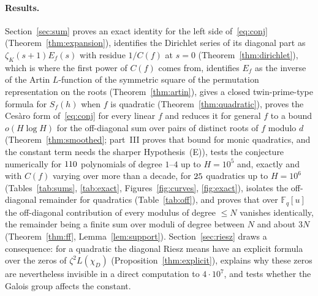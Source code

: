 \documentclass[11pt,a4paper]{article}
\theoremstyle{remark}\newtheorem{remark}[theorem]{Remark}
\newcommand{\F}{\mathbb{F}}
\begin{document}
\paragraph{Results.} Section~\ref{sec:sum} proves an exact identity for the left side
of~\eqref{eq:conj} (Theorem~\ref{thm:expansion}), identifies the Dirichlet series of its diagonal part
as $\zeta_K(s+1)E_f(s)$ with residue $1/C(f)$ at $s=0$ (Theorem~\ref{thm:dirichlet}), which is where
the first power of $C(f)$ comes from, identifies $E_f$ as the inverse of the Artin $L$-function of the
symmetric square of the permutation representation on the roots (Theorem~\ref{thm:artin}), gives a
closed twin-prime-type formula for $S_f(h)$ when $f$ is quadratic (Theorem~\ref{thm:quadratic}), proves
the Ces\`aro form of~\eqref{eq:conj} for every linear $f$ and reduces it for general $f$ to a bound
$o(H\log H)$ for the off-diagonal sum over pairs of distinct roots of $f$ modulo $d$
(Theorem~\ref{thm:smoothed}; part~III proves that bound for monic quadratics, and the constant term needs the sharper Hypothesis~(E)), tests the conjecture
numerically for $110$ polynomials of degree $1$--$4$ up to $H=10^5$ and, exactly and with $C(f)$
varying over more than a decade, for $25$ quadratics up to $H=10^6$ (Tables~\ref{tab:sums},
\ref{tab:exact}, Figures~\ref{fig:curves}, \ref{fig:exact}), isolates the off-diagonal remainder for
quadratics (Table~\ref{tab:off}), and proves that over $\F_q[u]$ the off-diagonal contribution of every
modulus of degree $\le N$ vanishes identically, the remainder being a finite sum over moduli of degree
between $N$ and about $3N$ (Theorem~\ref{thm:ff}, Lemma~\ref{lem:support}). Section~\ref{sec:riesz}
draws a consequence: for a quadratic the diagonal Riesz means have an explicit formula over the zeros of
$\zeta^2L(\chi_D)$ (Proposition~\ref{thm:explicit}), explains why these zeros are nevertheless invisible
in a direct computation to $4\cdot10^7$, and tests whether the Galois group affects the constant.
\end{document}
